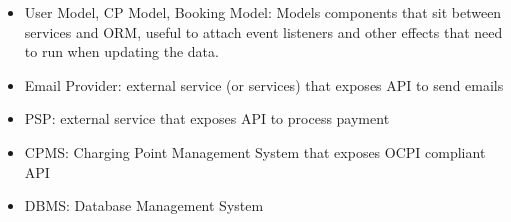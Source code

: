 \begin{itemize}
	\item User Model, CP Model, Booking Model: Models components that sit between services and ORM, useful to attach event listeners and other effects that need to run when updating the data. 
	\item Email Provider: external service (or services) that exposes API to send emails
	\item PSP: external service that exposes API to process payment
	\item CPMS: Charging Point Management System that exposes OCPI compliant API
	\item DBMS: Database Management System
\end{itemize}




















